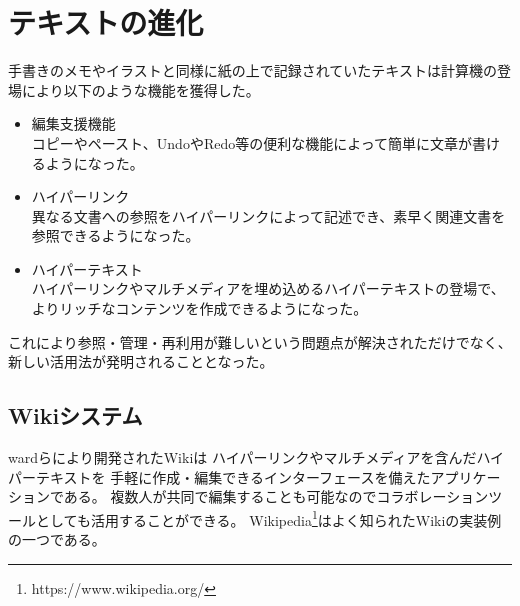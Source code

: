 \section{テキストの進化}
手書きのメモやイラストと同様に紙の上で記録されていたテキストは計算機の登場により以下のような機能を獲得した。
\begin{itemize}
    \item 編集支援機能\\
    コピーやペースト、UndoやRedo等の便利な機能によって簡単に文章が書けるようになった。
    \item ハイパーリンク\\
    異なる文書への参照をハイパーリンクによって記述でき、素早く関連文書を参照できるようになった。
    \item ハイパーテキスト\\
    ハイパーリンクやマルチメディアを埋め込めるハイパーテキストの登場で、よりリッチなコンテンツを作成できるようになった。
\end{itemize}
これにより参照・管理・再利用が難しいという問題点が解決されただけでなく、新しい活用法が発明されることとなった。

\subsection{Wikiシステム}

wardらにより開発されたWiki\cite{Leuf2001TheWW}は ハイパーリンクやマルチメディアを含んだハイパーテキストを
手軽に作成・編集できるインターフェースを備えたアプリケーションである。
複数人が共同で編集することも可能なのでコラボレーションツールとしても活用することができる。
Wikipedia\footnote{https://www.wikipedia.org/}はよく知られたWikiの実装例の一つである。

